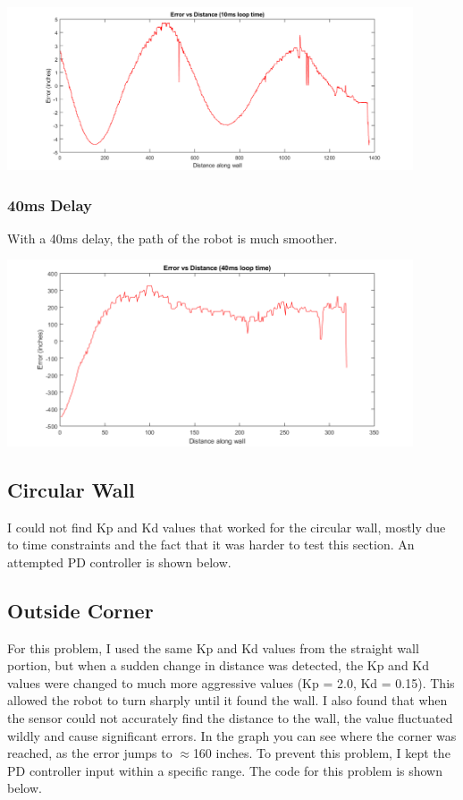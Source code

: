 \documentclass{article}
\begin{document}
	{\centering
	\includegraphics[width=0.9\textwidth]{10msStraightErr}\par
	}
	
	\subsubsection*{40ms Delay}
	
	With a 40ms delay, the path of the robot is much smoother.
	
	{\centering
	\includegraphics[width=0.9\textwidth]{40msStraightErr}\par
	}
	
	\subsection*{Circular Wall}
	
	I could not find Kp and Kd values that worked for the circular wall, mostly due to time constraints and the fact that it was harder to test this section. An attempted PD controller is shown below.
	
	
	
	\subsection*{Outside Corner}
	
	For this problem, I used the same Kp and Kd values from the straight wall portion, but when a sudden change in distance was detected, the Kp and Kd values were changed to much more aggressive values (Kp = 2.0, Kd = 0.15). This allowed the robot to turn sharply until it found the wall. I also found that when the sensor could not accurately find the distance to the wall, the value fluctuated wildly and cause significant errors. In the graph you can see where the corner was reached, as the error jumps to $\approx$160 inches. To prevent this problem, I kept the PD controller input within a specific range. The code for this problem is shown below.
	
\end{document}
